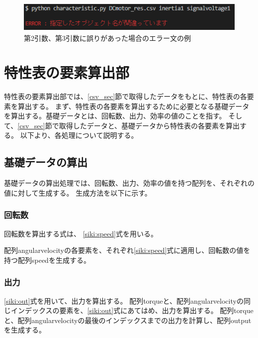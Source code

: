 \begin{figure}[t]
	\centering
	\includegraphics[width=12cm,height=1.5cm]{./Image/error_comand.png}
	\caption{第2引数、第3引数に誤りがあった場合のエラー文の例}
	\label{fig:error_comand}
\end{figure}

\section{特性表の要素算出部}\label{youso_sec}
特性表の要素算出部では、\ref{csv_sec}節で取得したデータをもとに、特性表の各要素を算出する。
まず、特性表の各要素を算出するために必要となる基礎データを算出する。基礎データとは、回転数、出力、効率の値のことを指す。
そして、\ref{csv_sec}節で取得したデータと、基礎データから特性表の各要素を算出する。
以下より、各処理について説明する。

\subsection{基礎データの算出}\label{sub:youso_kiso}
基礎データの算出処理では、回転数、出力、効率の値を持つ配列を、それぞれの値に対して生成する。
生成方法を以下に示す。

\subsubsection{回転数}\label{sub:sub:kaiten}
回転数を算出する式は、%
\ref{siki:speed}式を用いる。

配列angularvelocityの各要素を、それぞれ\ref{siki:speed}式に適用し、回転数の値を持つ配列speedを生成する。

\subsubsection{出力}\label{sub:sub:syutu}
\ref{siki:out}式を用いて、出力を算出する。
配列torqueと、配列angularvelocityの同じインデックスの要素を、\ref{siki:out}式にあてはめ、出力を算出する。
配列torqueと、配列angularvelocityの最後のインデックスまでの出力を計算し、配列outputを生成する。
